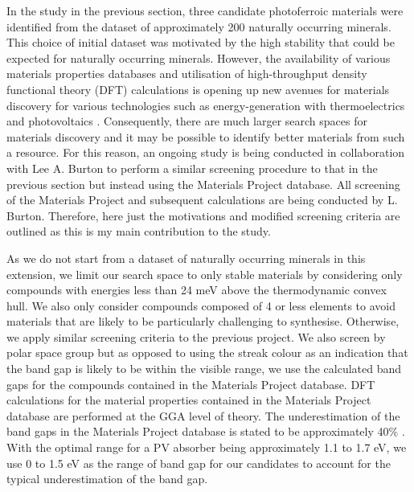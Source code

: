 \documentclass[11pt, twoside]{report}
\begin{document}

In the study in the previous section, three candidate photoferroic materials were identified from the dataset of approximately 200 naturally occurring minerals. This choice of initial dataset was motivated by the high stability that could be expected for naturally occurring minerals. However, the availability of various materials properties databases \cite{materials_project, aflowlib, NREL_data, TE_database, cmr, NOMAD} and utilisation of high-throughput density functional theory (DFT) calculations \cite{MP_highthroughput, HT_therm_cond, HT_properties} is opening up new avenues for materials discovery for various technologies \cite{roadmap} such as energy-generation with thermoelectrics \cite{thermoelectrics_rev, HT_thermoelectrics_1, HT_thermoelectrics_2} and photovoltaics \cite{SLME_screening, HT_PV, perovskite_screening_1, perovskite_screening_2, OPV_screening}.
Consequently, there are much larger search spaces for materials discovery and it may be possible to identify better materials from such a resource. 
For this reason, an ongoing study is being conducted in collaboration with Lee A. Burton to perform a similar screening procedure to that in the previous section but instead using the Materials Project \cite{materials_project} database. All screening of the Materials Project and subsequent calculations are being conducted by L. Burton. Therefore, here just the motivations and modified screening criteria are outlined as this is my main contribution to the study.

As we do not start from a dataset of naturally occurring minerals in this extension, we limit our search space to only stable materials by considering only compounds with energies less than 24 meV above the thermodynamic convex hull. We also only consider compounds composed of 4 or less elements to avoid materials that are likely to be particularly challenging to synthesise. 
Otherwise, we apply similar screening criteria to the previous project. We also screen by polar space group but as opposed to using the streak colour as an indication that the band gap is likely to be within the visible range, we use the calculated band gaps for the compounds contained in the Materials Project database. DFT calculations for the material properties contained in the Materials Project database are performed at the GGA level of theory.
The underestimation of the band gaps in the Materials Project database is stated to be approximately 40\% \cite{MP_bandgaps, MP_highthroughput}. With the optimal range for a PV absorber being approximately 1.1 to 1.7 eV, we use 0 to 1.5 eV as the range of band gap for our candidates to account for the typical underestimation of the band gap. 
\end{document}
